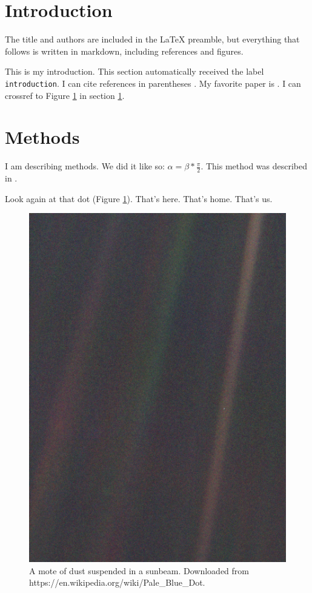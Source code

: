 \hypertarget{introduction}{%
\section{Introduction}\label{introduction}}

The title and authors are included in the LaTeX preamble, but everything
that follows is written in markdown, including references and figures.

This is my introduction. This section automatically received the label
\texttt{introduction}. I can cite references in parentheses
\citep[see][]{bainbridgeResiliencyImageMemorability2020}. My favorite
paper is \citet{adrianBergerRhythmPotential1934}. I can crossref to
Figure \ref{paleblue} in section \ref{introduction}.

\hypertarget{sec:methods}{%
\section{Methods}\label{sec:methods}}

I am describing methods. We did it like so:
\(\alpha=\beta * \frac{\pi}{2}\). This method was described in
\citep{michelDistinctContributions2021}.

Look again at that dot (Figure \ref{paleblue}). That's here. That's
home. That's us.

\begin{figure}
\centering
\includegraphics[width=\textwidth,height=0.5\textheight]{Pale_Blue_Dot.png}
\caption{A mote of dust suspended in a sunbeam. Downloaded from
https://en.wikipedia.org/wiki/Pale\_Blue\_Dot. \label{paleblue}}
\end{figure}
